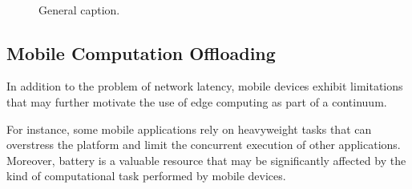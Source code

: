
\begin{figure}[tbp]
	\centering
	\hfill
	~
	\hfill
	\caption{General caption.} \label{fig:1}
\end{figure}

\subsection{Mobile Computation Offloading}

In addition to the problem of network latency, mobile devices exhibit limitations that may further motivate the use of edge computing as part of a continuum. 

For instance, some mobile applications rely on heavyweight tasks that can overstress the platform and limit the concurrent execution of other applications. Moreover, battery is a valuable resource that may be significantly affected by the kind of computational task performed by mobile devices. 

